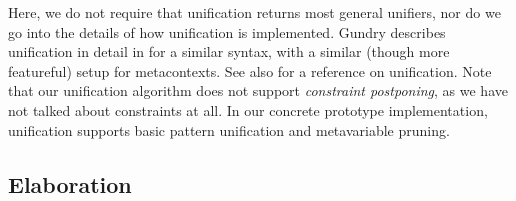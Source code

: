 \documentclass[acmsmall,review,anonymous,prologue,dvipsnames]{acmart}\settopmatter{printfolios=true,printccs=false,printacmref=false}
\theoremstyle{remark}
\begin{document}
Here, we do not require that unification returns most general unifiers, nor do
we go into the details of how unification is implemented. Gundry describes
unification in detail in \cite[Chapter~4]{gundry2013type} for a similar syntax,
with a similar (though more featureful) setup for metacontexts. See also
\cite{abel2011higher} for a reference on unification. Note that our unification
algorithm does not support \emph{constraint postponing}, as we have not talked
about constraints at all. In our concrete prototype implementation, unification
supports basic pattern unification and metavariable pruning.

\subsection{Elaboration}
\end{document}

